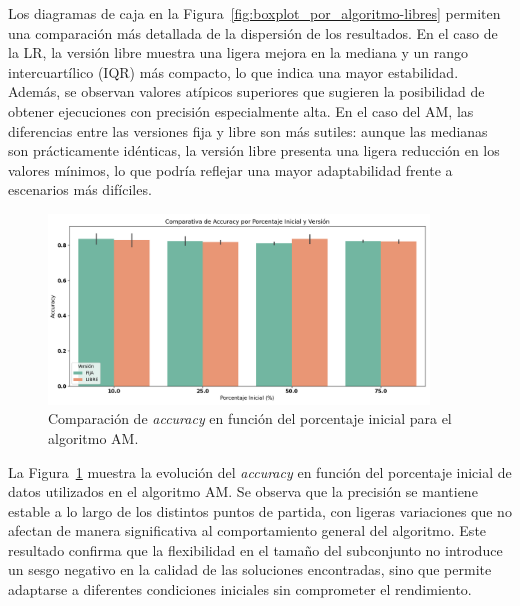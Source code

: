 Los diagramas de caja en la Figura~\ref{fig:boxplot_por_algoritmo-libres} permiten una comparación más detallada de la dispersión de los resultados.
En el caso de la LR, la versión libre muestra una ligera mejora en la mediana y un rango intercuartílico (IQR) más compacto, lo que indica una mayor estabilidad.
Además, se observan valores atípicos superiores que sugieren la posibilidad de obtener ejecuciones con precisión especialmente alta.
En el caso del AM, las diferencias entre las versiones fija y libre son más sutiles: aunque las medianas son prácticamente idénticas,
la versión libre presenta una ligera reducción en los valores mínimos, lo que podría reflejar una mayor adaptabilidad frente a escenarios más difíciles.


\begin{figure}[htp]
    \centering
    \includegraphics[width=0.9\textwidth]{imagenes/evaluaciones/libres/am_por_pi}
    \caption{Comparación de \textit{accuracy} en función del porcentaje inicial para el algoritmo AM.}
    \label{fig:am_por_pi}
\end{figure}

La Figura~\ref{fig:am_por_pi} muestra la evolución del \textit{accuracy} en función del porcentaje inicial de datos utilizados en el algoritmo AM.
Se observa que la precisión se mantiene estable a lo largo de los distintos puntos de partida,
con ligeras variaciones que no afectan de manera significativa al comportamiento general del algoritmo.
Este resultado confirma que la flexibilidad en el tamaño del subconjunto no introduce un sesgo negativo en la calidad de las soluciones encontradas,
sino que permite adaptarse a diferentes condiciones iniciales sin comprometer el rendimiento.


